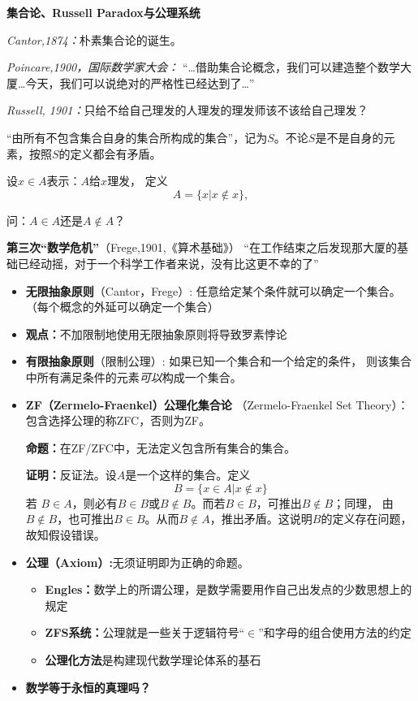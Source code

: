 \begin{shaded}

{\bf 集合论、Russell Paradox与公理系统}

	{\it Cantor,1874：}朴素集合论的诞生。	

	{\it Poincare,1900，国际数学家大会：} 
		 {“\ldots 借助集合论概念，我们可以建造整个数学大厦\ldots  今天，我们可以说绝对的严格性已经达到了\ldots”}
	
	{\it Russell, 1901：}只给不给自己理发的人理发的理发师该不该给自己理发？
	
	“由所有不包含集合自身的集合所构成的集合”，记为$S$。不论$S$是不是自身的元素，按照$S$的定义都会有矛盾。
	
	设$x\in A$表示：$A$给$x$理发， 定义
	$$A=\{x|x\notin x\},$$ 
	
	问：$A\in A$还是$A\notin A$？ 
	
	{{\bf {第三次“数学危机”}}（Frege,1901,《算术基础》）}
		“在工作结束之后发现那大厦的基础已经动摇，对于一个科学工作者来说，没有比这更不幸的了”
		
	\begin{itemize}
	  \item {{\bf 无限抽象原则}（Cantor，Frege）:} 任意给定某个条件就可以确定一个集合。（每个概念的外延可以确定一个集合）
	  \item {\bf 观点：}不加限制地使用无限抽象原则将导致罗素悖论
	  \item {{\bf 有限抽象原则}（限制公理）:} 如果已知一个集合和一个给定的条件，
	  则该集合中所有满足条件的元素{\it 可以}构成一个集合。
	  \item {\bf ZF（Zermelo-Fraenkel）公理化集合论}
	  （Zermelo-Fraenkel Set Theory）：包含选择公理的称ZFC，否则为ZF。
	  
	  {\bf 命题：}在ZF/ZFC中，无法定义包含所有集合的集合。
	
	{\bf 证明：}反证法。设$A$是一个这样的集合。定义
	$$B=\{x\in A|x\notin x\}$$
	若
	$B\in A$，则必有$B\in B$或$B\notin B$。而若$B\in B$，可推出$B\notin B$；同理，
	由$B\notin B$，也可推出$B\in B$。从而$B\notin A$，推出矛盾。这说明$B$的定义存在问题，故知假设错误。

	\item {\bf 公理（Axiom）:}无须证明即为正确的命题。
	\begin{itemize}
	  \item {\bf Engles：}数学上的所谓公理，是数学需要用作自己出发点的少数思想上的规定 
	  \item {\bf ZFS系统：}公理就是一些关于逻辑符号{“$\in$”}和{字母}的组合使用方法的约定
	  \item {\bf 公理化方法}是构建现代数学理论体系的基石
	\end{itemize}
	\item {\bf {数学等于永恒的真理吗？}}
	\end{itemize}
	

\end{shaded}

